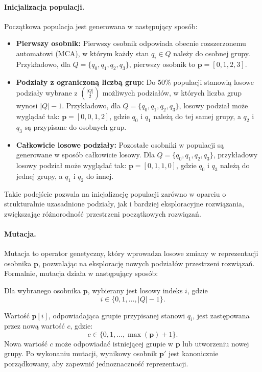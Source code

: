 \paragraph*{Inicjalizacja populacji.}  
Początkowa populacja jest generowana w następujący sposób:
\begin{itemize}
    \item \textbf{Pierwszy osobnik:}  
    Pierwszy osobnik odpowiada obecnie rozszerzonemu automatowi (MCA), w którym każdy stan \( q_i \in Q \) należy do osobnej grupy. Przykładowo, dla \( Q = \{q_0, q_1, q_2, q_3\} \), pierwszy osobnik to \( \mathbf{p} = [0, 1, 2, 3] \).
    
    \item \textbf{Podziały z ograniczoną liczbą grup:}  
    Do 50\% populacji stanowią losowe podziały wybrane z \( \binom{|Q|}{2} \) możliwych podziałów, w których liczba grup wynosi \( |Q| - 1 \). Przykładowo, dla \( Q = \{q_0, q_1, q_2, q_3\} \), losowy podział może wyglądać tak: \( \mathbf{p} = [0, 0, 1, 2] \), gdzie \( q_0 \) i \( q_1 \) należą do tej samej grupy, a \( q_2 \) i \( q_3 \) są przypisane do osobnych grup.
    
    \item \textbf{Całkowicie losowe podziały:}  
    Pozostałe osobniki w populacji są generowane w sposób całkowicie losowy. Dla \( Q = \{q_0, q_1, q_2, q_3\} \), przykładowy losowy podział może wyglądać tak: \( \mathbf{p} = [0, 1, 1, 0] \), gdzie \( q_0 \) i \( q_3 \) należą do jednej grupy, a \( q_1 \) i \( q_2 \) do innej.
\end{itemize}

Takie podejście pozwala na inicjalizację populacji zarówno w oparciu o strukturalnie uzasadnione podziały, jak i bardziej eksploracyjne rozwiązania, zwiększając różnorodność przestrzeni początkowych rozwiązań.

\paragraph*{Mutacja.}  
Mutacja to operator genetyczny, który wprowadza losowe zmiany w reprezentacji osobnika \( \mathbf{p} \), pozwalając na eksplorację nowych podziałów przestrzeni rozwiązań. Formalnie, mutacja działa w następujący sposób:

Dla wybranego osobnika \( \mathbf{p} \), wybierany jest losowy indeks \( i \), gdzie 
\[ i \in \{0, 1, \dots, |Q|-1\}. \]

Wartość \( \mathbf{p}[i] \), odpowiadająca grupie przypisanej stanowi \( q_i \), jest zastępowana przez nową wartość \( c \), gdzie:
\[
c \in \{0, 1, \dots, \max(\mathbf{p}) + 1\}.
\]
Nowa wartość \( c \) może odpowiadać istniejącej grupie w \( \mathbf{p} \) lub utworzeniu nowej grupy. Po wykonaniu mutacji, wynikowy osobnik \( \mathbf{p}' \) jest kanonicznie porządkowany, aby zapewnić jednoznaczność reprezentacji.

